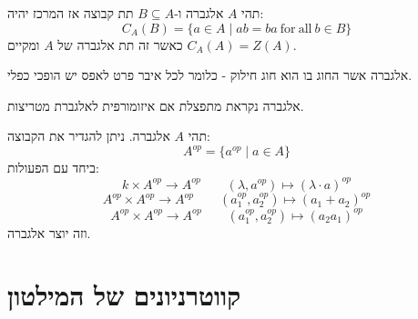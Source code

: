 \documentclass{tstextbook}
\begin{document}
\begin{definition}
תהי \(A\) אלגברה ו-\(B\subseteq A\) תת קבוצה אז המרכז יהיה:
$$C_{A}(B)=\{a\in A\mid a b=b a{\mathrm{~for~all~}}b\in B\}$$
כאשר זה תת אלגברה של \(A\) ומקיים \(C_{A}(A)=Z(A)\).

\end{definition}
\begin{definition}
אלגברה אשר החוג בו הוא חוג חילוק - כלומר לכל איבר פרט לאפס יש הופכי כפלי.

\end{definition}
\begin{definition}
אלגברה נקראת מתפצלת אם איזומורפית לאלגברת מטריצות.

\end{definition}
\begin{definition}
תהי \(A\) אלגברה. ניתן להגדיר את הקבוצה:
$$A^{o p}=\{a^{o p}\mid a\in A\}$$
ביחד עם הפעולות:
$$k\times A^{o p}\longrightarrow A^{o p}\qquad (\lambda,a^{o p})\longmapsto(\lambda{\cdot}a)^{o p}$$$$A^{o p}\times A^{o p}\longrightarrow A^{o p}\qquad (a_{1}^{o p},a_{2}^{o p})\longmapsto(a_{1}+a_{2})^{o p}$$$$A^{o p}\times A^{o p}\longrightarrow A^{o p}\qquad (a_{1}^{o p},a_{2}^{o p})\longmapsto(a_{2}a_{1})^{o p}$$
וזה יוצר אלגברה.

\end{definition}
\section{קווטרניונים של המילטון}
\end{document}
